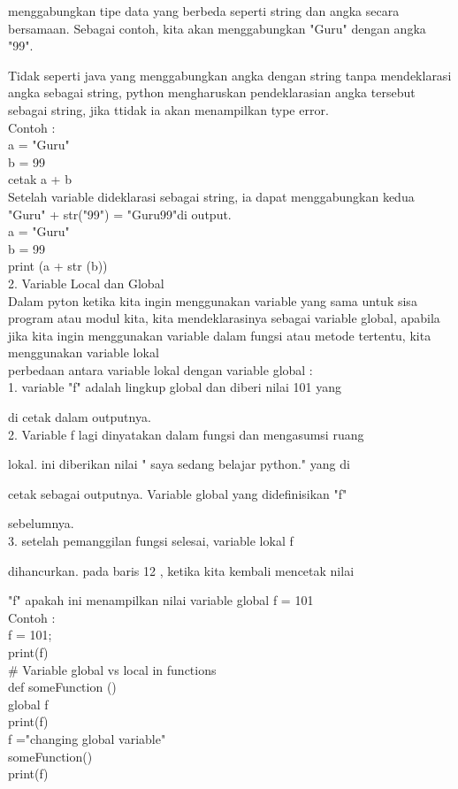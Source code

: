      menggabungkan tipe data yang berbeda seperti string dan angka secara bersamaan. Sebagai contoh,  kita akan menggabungkan "Guru" dengan angka "99". 
     
     Tidak seperti java yang menggabungkan angka dengan string tanpa mendeklarasi angka sebagai string, python mengharuskan pendeklarasian angka tersebut sebagai string, jika ttidak ia akan menampilkan type error.\\
     Contoh :\\
     a = "Guru"\\
     b = 99\\
     cetak a + b\\
     
     Setelah variable dideklarasi sebagai string, ia dapat menggabungkan kedua "Guru" + str("99") = "Guru99"di output.\\
     a = "Guru"\\
     b = 99\\
     print (a + str (b))\\
     
     
     2. Variable Local dan Global\\
     
     Dalam pyton ketika kita ingin menggunakan variable yang sama untuk sisa program atau modul kita, kita mendeklarasinya sebagai variable global, apabila jika kita ingin menggunakan variable dalam fungsi atau metode tertentu, kita menggunakan variable lokal\\
    perbedaan antara variable lokal dengan variable global :\\
    1. variable "f" adalah lingkup global dan diberi nilai 101 yang
    
    di cetak dalam outputnya.\\
    2. Variable f lagi dinyatakan dalam fungsi dan mengasumsi ruang
    
    lokal. ini diberikan nilai " saya sedang belajar python." yang di
    
    cetak sebagai outputnya. Variable global yang didefinisikan "f"
    
    sebelumnya.\\
    3. setelah pemanggilan fungsi selesai, variable lokal f 
    
    dihancurkan. pada baris 12 , ketika kita kembali mencetak nilai 
    
    "f" apakah ini menampilkan nilai variable global f = 101 \\
     Contoh :\\
     f = 101;\\
     print(f)\\
     \# Variable global vs local in functions\\
     def someFunction ()\\
     global f\\
     print(f)\\
     f ="changing global variable"\\
     someFunction()\\
     print(f)\\
     
